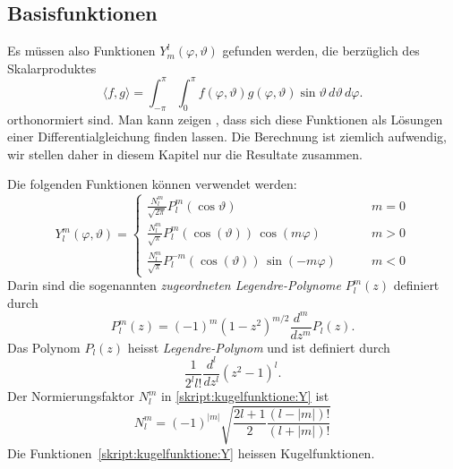 \subsection{Basisfunktionen}
Es müssen also Funktionen $Y_m^l(\varphi,\vartheta)$ gefunden werden,
die berzüglich des Skalarproduktes
\begin{equation}
\langle f,g\rangle
=
\int_{-\pi}^{\pi} \int_0^\pi 
f(\varphi,\vartheta) g(\varphi,\vartheta)
\sin\vartheta\,d\vartheta\,d\varphi
\label{skript:kugelfunktionen:skalarprodukt}.
\end{equation}
orthonormiert sind.
Man kann zeigen \cite{skript:tabea}, dass sich diese Funktionen als Lösungen
einer Differentialgleichung finden lassen.
Die Berechnung ist ziemlich aufwendig, wir stellen daher in diesem
Kapitel nur die Resultate zusammen.

Die folgenden Funktionen können verwendet werden:
\begin{equation}
Y^m_l(\varphi,\vartheta)
=
\begin{cases}
\displaystyle
\frac{N^m_l}{\sqrt{2\pi}} P^m_l(\cos\vartheta)&\qquad m=0
\\[10pt]
\displaystyle
\frac{N^m_l}{\sqrt{\pi}} P^m_l(\cos(\vartheta))\,\cos(m\varphi)&\qquad m>0
\\[10pt]
\displaystyle
\frac{N^m_l}{\sqrt{\pi}} P^{-m}_l(\cos(\vartheta))\,\sin(-m\varphi)&\qquad m<0
\end{cases}
\label{skript:kugelfunktione:Y}
\end{equation}
Darin sind die sogenannten {\em zugeordneten Legendre-Polynome} $P^m_l(z)$
definiert durch
\begin{equation}
P^m_l(z)
=
(-1)^m(1-z^2)^{m/2}\frac{d^m}{dz^m}P_l(z).
\end{equation}
Das Polynom $P_l(z)$ heisst {\em Legendre-Polynom}
%
und ist definiert durch
\begin{equation}
\frac{1}{2^ll!}\frac{d^l}{dz^l}(z^2-1)^l.
\end{equation}
Der Normierungsfaktor $N^m_l$ in 
\eqref{skript:kugelfunktione:Y}
ist
\begin{equation}
N^m_l
=
(-1)^{|m|}\sqrt{
\frac{2l+1}{2}\frac{(l-|m|)!}{(l+|m|)!}
}
\end{equation}
Die Funktionen~\eqref{skript:kugelfunktione:Y} heissen Kugelfunktionen.

